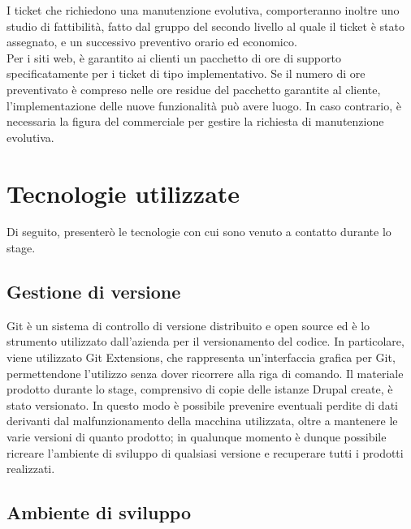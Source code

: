 		I ticket che richiedono una manutenzione evolutiva, comporteranno inoltre uno studio di fattibilità, fatto dal gruppo del secondo livello al quale il ticket è stato assegnato, e un successivo preventivo orario ed economico. \\
		Per i siti web, è garantito ai clienti un pacchetto di ore di supporto specificatamente per i ticket di tipo implementativo. Se il numero di ore preventivato è compreso nelle ore residue del pacchetto garantite al cliente, l'implementazione delle nuove funzionalità può avere luogo. In caso contrario, è necessaria la figura del commerciale per gestire la richiesta di manutenzione evolutiva.

\section{Tecnologie utilizzate}
\label{sec:tecnologie_utilizzate}
Di seguito, presenterò le tecnologie con cui sono venuto a contatto durante lo stage.

	\subsection{Gestione di versione}
	\gls{Git} è un sistema di controllo di versione distribuito e \gls{open source} ed è lo strumento utilizzato dall'azienda per il versionamento del codice. In particolare, viene utilizzato \gls{Git Extensions}, che rappresenta un'interfaccia grafica per \gls{Git}, permettendone l'utilizzo senza dover ricorrere alla riga di comando.
	Il materiale prodotto durante lo stage, comprensivo di copie delle istanze \gls{Drupal} create, è stato versionato. In questo modo è possibile prevenire eventuali perdite di dati derivanti dal malfunzionamento della macchina utilizzata, oltre a mantenere le varie versioni di quanto prodotto; in qualunque momento è dunque possibile ricreare l'ambiente di sviluppo di qualsiasi versione e recuperare tutti i prodotti realizzati.
	
	\subsection{Ambiente di sviluppo}
	
